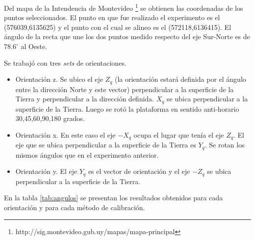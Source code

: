 \documentclass[spanish,12pt,a4paper,titlepage]{report}
\begin{document}
Del mapa de la Intendencia de Montevideo \footnote{http://sig.montevideo.gub.uy/mapas/mapa-principal} se obtienen las coordenadas de los puntos seleccionados. El punto en que fue realizado el experimento es el (576039,6135625) y el punto con el cual se alineo es el (572118,6136415). El ángulo de la recta que une los dos puntos medido respecto del eje Sur-Norte es de $78.6^\circ$ al Oeste.

Se trabajó con tres \emph{sets} de orientaciones. 
\begin{itemize}
\item Orientación z. Se ubico el eje $Z_q$ (la orientación estará definida por el ángulo entre la dirección Norte y este vector) perpendicular a la superficie de la Tierra y perpendicular a la dirección definida. $X_q$ se ubica perpendicular a la superficie de la Tierra.  Luego se rotó la plataforma en sentido anti-horario 30,45,60,90,180 grados. 
\item Orientación x. En este caso el eje $-X_q$ ocupa el lugar que  tenía el eje $Z_q$. El eje que se ubica perpendicular a la superficie de la Tierra es $Y_q$. Se rotan los mismos ángulos que en el experimento anterior.
\item Orientación y. El eje $Y_q$ es el vector de orientación y el eje $-Z_q$ se ubica perpendicular a la superficie de la Tierra. 
\end{itemize} 


En la tabla \ref{tab:angulos} se presentan los resultados obtenidos para cada orientación y para cada método de calibración. 
\end{document}
